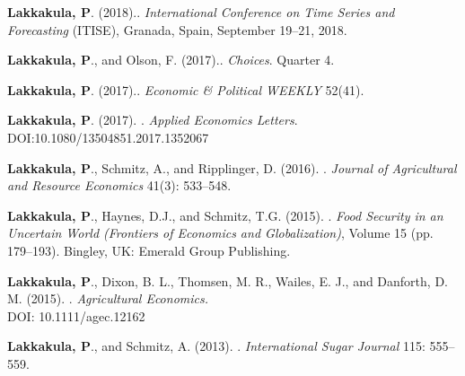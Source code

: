 \documentclass[margin,line]{res}
\newenvironment{list2}{
  \begin{list}{$\bullet$}{%
    \setlength{\itemsep}{0in}
    \setlength{\parsep}{0in} \setlength{\parskip}{0in}
    \setlength{\topsep}{0in} \setlength{\partopsep}{0in}
    \setlength{\leftmargin}{0.2in}}}{\end{list}}
\begin{document}
\begin{resume}
\begin{etaremune}
\item {\bf Lakkakula, P}. (2018).\href{https://drive.google.com/file/d/1tGgLDFsG0a1c6tacnu3UusQmmJSwS5bK/view}{}. {\em International Conference on Time Series and Forecasting} (ITISE), Granada, Spain, September 19--21, 2018.
\item {\bf Lakkakula, P}., and Olson, F. (2017).\href{http://www.choicesmagazine.org/choices-magazine/submitted-articles/sweeteners-may-leave-a-sour-note-on-nafta-renegotiations}{}. {\em Choices}. Quarter 4.
\item {\bf Lakkakula, P}. (2017).\href{http://www.epw.in/engage/article/what-are-effects-gst-indian-agriculture-case-turmeric}{}. {\em Economic \& Political WEEKLY} 52(41).
\item {\bf Lakkakula, P}. (2017). \href{http://www.tandfonline.com/doi/full/10.1080/13504851.2017.1352067}{}. {\em Applied Economics Letters}. DOI:10.1080/13504851.2017.1352067
\item {\bf Lakkakula, P}., Schmitz, A., and Ripplinger, D. (2016). \href{http://www.waeaonline.org/UserFiles/file/JARESeptember201611Lakkakula533-548.pdf}{}. {\em Journal of Agricultural and Resource Economics} 41(3): 533--548.
\item {\bf Lakkakula, P}., Haynes, D.J., and Schmitz, T.G. (2015). \href{http://www.emeraldinsight.com/doi/pdfplus/10.1108/S1574-871520150000015020}{}. \textit{Food Security in an Uncertain World (Frontiers of Economics and Globalization)}, Volume 15 (pp. 179--193). Bingley, UK: Emerald Group Publishing.
\item {\bf Lakkakula, P}., Dixon, B. L., Thomsen, M. R., Wailes, E. J., and Danforth, D. M. (2015). \href{http://onlinelibrary.wiley.com/doi/10.1111/agec.12162/abstract}{}. {\em Agricultural Economics.} \\ DOI: 10.1111/agec.12162 
\item {\bf Lakkakula, P}., and Schmitz, A. (2013). \href{https://www.internationalsugarjournal.com/paper/sugar-and-high-fructose-corn-syrup-consumption-shifts-change-in-tastes-or-relative-prices/}{}. {\em International Sugar Journal} 115: 555--559. 
\end{etaremune}


\end{resume}
\end{document}
